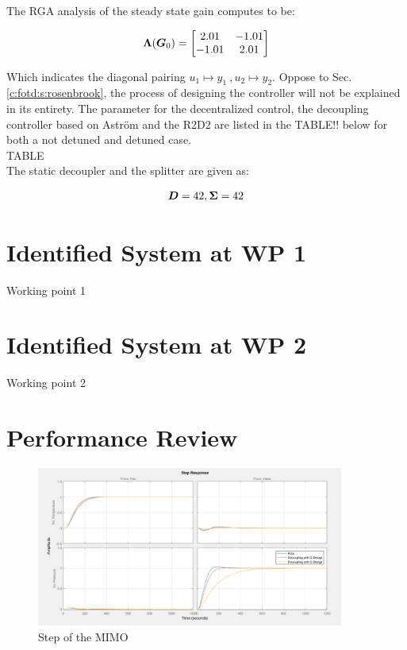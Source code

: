 The RGA analysis of the steady state gain computes to be:

\begin{align*}
\mbox{\boldmath$\Lambda$}(\mbox{\boldmath$G$}_0) = \begin{bmatrix}
2.01 & -1.01 \\
-1.01 & 2.01
\end{bmatrix}
\end{align*} 

Which indicates the diagonal pairing $u_1 \mapsto y_1~, u_2 \mapsto y_2$. Oppose to Sec.\ref{c:fotd:s:rosenbrook}, the process of designing the controller will not be explained in its entirety. The parameter for the decentralized control, the decoupling controller based on Astr\"om and the R2D2 are listed in the TABLE!! below for both a not detuned and detuned case.\\

TABLE\\

The static decoupler and the splitter are given as:

\begin{align*}
\mbox{\boldmath$D$} = 42, \mbox{\boldmath$\Sigma$} = 42
\end{align*}


\section{Identified System at WP 1}%
\label{c:fotd:s:wp1}

Working point 1

\section{Identified System at WP 2}%
\label{c:fotd:s:wp1}

Working point 2

\section{Performance Review} %
\label{c:fotd:s:performance_review}

\begin{figure}[H]
\begin{minipage}[b]{\textwidth}
\centering
\includegraphics[width=0.9\textwidth]{./Graphics/Step_MATLAB.png}
\caption{Step of the MIMO}
\label{c:fotd:f:mimo_step}
\end{minipage}
\end{figure}

